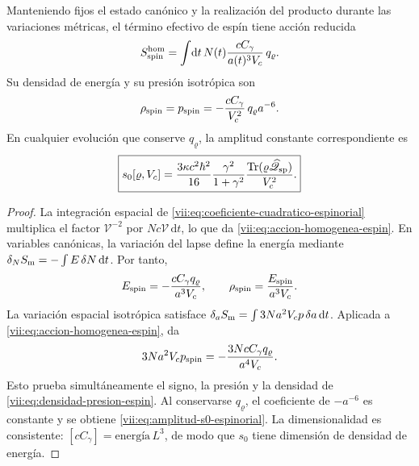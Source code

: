 \begin{theorem}
\label{vii:thm:amplitud-material-explicita}
Manteniendo fijos el estado canónico y la realización del producto
durante las variaciones métricas, el término efectivo de espín tiene
acción reducida
\begin{equation}
 S_{\rm spin}^{\rm hom}
 =\int\!\mathrm dt\,N(t)
       \frac{cC_\gamma}{a(t)^3V_c}\,q_\varrho.
 \label{vii:eq:accion-homogenea-espin}
\end{equation}
Su densidad de energía y su presión isotrópica son
\begin{equation}
 \rho_{\rm spin}=p_{\rm spin}
 =-\frac{cC_\gamma}{V_c^2}\,q_\varrho a^{-6}.
 \label{vii:eq:densidad-presion-espin}
\end{equation}
En cualquier evolución que conserve \(q_\varrho\), la amplitud
constante correspondiente es
\begin{equation}
 \boxed{\displaystyle
 s_0[\varrho,V_c]
 =\frac{3\kappa c^2\hbar^2}{16}
    \frac{\gamma^2}{1+\gamma^2}
    \frac{\operatorname{Tr}
       (\varrho\widehat{\mathscr Q}_{\rm sp})}{V_c^2}.}
 \label{vii:eq:amplitud-s0-espinorial}
\end{equation}
\end{theorem}
\begin{proof}
La integración espacial de
\eqref{vii:eq:coeficiente-cuadratico-espinorial} multiplica el
factor \(\mathcal V^{-2}\) por
\(Nc\mathcal V\,\mathrm dt\), lo que da
\eqref{vii:eq:accion-homogenea-espin}. En variables canónicas,
la variación del lapse define la energía mediante
\(\delta_N S_{\rm m}=-\int E\,\delta N\,\mathrm dt\).
Por tanto,
\[
 E_{\rm spin}=-\frac{cC_\gamma q_\varrho}{a^3V_c},
 \qquad \rho_{\rm spin}=\frac{E_{\rm spin}}{a^3V_c}.
\]
La variación espacial isotrópica satisface
\(\delta_a S_{\rm m}=\int3Na^2V_c p\,\delta a\,\mathrm dt\).
Aplicada a \eqref{vii:eq:accion-homogenea-espin}, da
\[
 3Na^2V_c p_{\rm spin}
 =-\frac{3NcC_\gamma q_\varrho}{a^4V_c}.
\]
Esto prueba simultáneamente el signo, la presión y la densidad de
\eqref{vii:eq:densidad-presion-espin}. Al conservarse
\(q_\varrho\), el coeficiente de \(-a^{-6}\) es constante y
se obtiene \eqref{vii:eq:amplitud-s0-espinorial}. La dimensionalidad
es consistente: \([cC_\gamma]=\mathrm{energía}\,L^3\),
de modo que \(s_0\) tiene dimensión de densidad de energía.
\end{proof}

